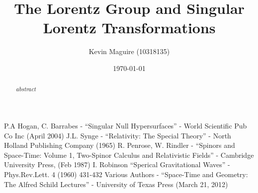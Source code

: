 \documentclass[floatfix,aps,prd,amsmath,amssymb]{revtex4}
\begin{document}
\title{The Lorentz Group and Singular Lorentz Transformations}
\author{Kevin Maguire (10318135)}
\date{\today}

\begin{abstract}
\textit{abstract}
\end{abstract}

\maketitle
{}


\newpage

\tableofcontents

\newpage









 






\begin{thebibliography}{10}
P.A Hogan, C. Barrabes - ``Singular Null Hypersurfaces'' - World Scientific Pub Co Inc (April 2004)
J.L. Synge - ``Relativity: The Special Theory'' - North Holland Publishing Company (1965)
R. Penrose, W. Rindler - ``Spinors and Space-Time: Volume 1, Two-Spinor Calculus and Relativistic Fields'' - Cambridge University Press, (Feb 1987)
I. Robinson ``Sperical Gravitational Waves'' - Phys.Rev.Lett. 4 (1960) 431-432
Various Authors - ``Space-Time and Geometry: The Alfred Schild Lectures'' - University of Texas Press (March 21, 2012)
\end{thebibliography}
\end{document}
